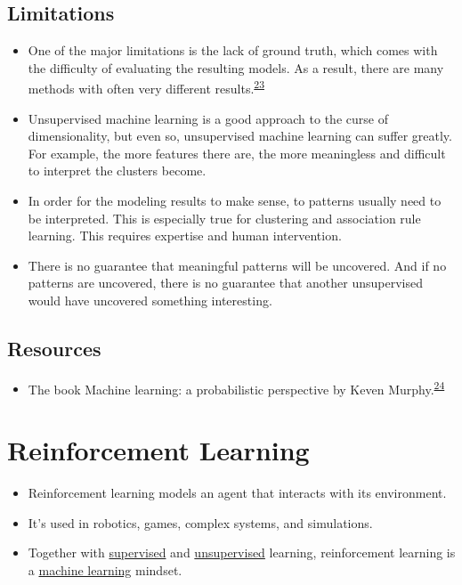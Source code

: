 \documentclass[
  10pt,
]{scrbook}
\providecommand{\tightlist}{%
  \setlength{\itemsep}{0pt}\setlength{\parskip}{0pt}}
\begin{document}
\hypertarget{limitations-7}{%
\section{Limitations}\label{limitations-7}}

\begin{itemize}
\tightlist
\item
  One of the major limitations is the lack of ground truth, which comes with the difficulty of evaluating the resulting models. As a result, there are many methods with often very different results.\textsuperscript{\protect\hyperlink{ref-hastie2009elements}{23}}
\item
  Unsupervised machine learning is a good approach to the curse of dimensionality, but even so, unsupervised machine learning can suffer greatly. For example, the more features there are, the more meaningless and difficult to interpret the clusters become.
\item
  In order for the modeling results to make sense, to patterns usually need to be interpreted. This is especially true for clustering and association rule learning. This requires expertise and human intervention.
\item
  There is no guarantee that meaningful patterns will be uncovered. And if no patterns are uncovered, there is no guarantee that another unsupervised would have uncovered something interesting.
\end{itemize}

\hypertarget{resources-1}{%
\section{Resources}\label{resources-1}}

\begin{itemize}
\tightlist
\item
  The book Machine learning: a probabilistic perspective by Keven Murphy.\textsuperscript{\protect\hyperlink{ref-murphy2012machine}{24}}
\end{itemize}

\hypertarget{reinforcement-learning}{%
\chapter{Reinforcement Learning}\label{reinforcement-learning}}

\begin{itemize}
\tightlist
\item
  Reinforcement learning models an agent that interacts with its environment.
\item
  It's used in robotics, games, complex systems, and simulations.
\item
  Together with \protect\hyperlink{supervised}{supervised} and \protect\hyperlink{unsupervised-ml}{unsupervised} learning, reinforcement learning is a \protect\hyperlink{machine-learning}{machine learning} mindset.
\end{itemize}
\end{document}
